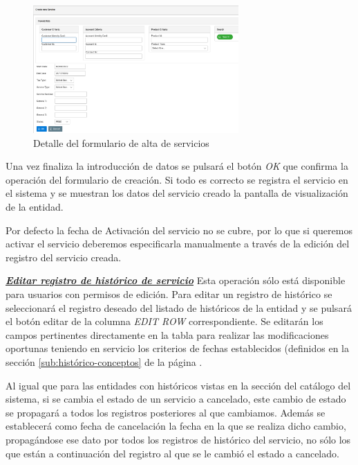 \begin{figure}[H]
  \centering
  \includegraphics[width=0.70\textwidth]{imaxes/formulario-alta-servicio.png}
  \caption{Detalle del formulario de alta de servicios}
  \label{fig:formulario-alta-servicio}
\end{figure}

Una vez finaliza la introducción de datos se pulsará el botón \emph{OK} que confirma la operación del formulario de creación. Si todo es correcto se registra el servicio en el sistema y se muestran los datos del servicio creado la pantalla de visualización de la entidad.

Por defecto la fecha de Activación del servicio no se cubre, por lo que si queremos activar el servicio deberemos especificarla manualmente a través de la edición del registro del servicio creada.


\underline{\textsl{\textbf{Editar registro de histórico de servicio}}}\newline
Esta operación sólo está disponible para usuarios con permisos de edición.
Para editar un registro de histórico se seleccionará el registro deseado del listado de históricos de la entidad y se pulsará el botón editar de la columna \textit{EDIT ROW} correspondiente. Se editarán los campos pertinentes directamente en la tabla para realizar las modificaciones oportunas teniendo en servicio los criterios de fechas establecidos (definidos en la sección \ref{sub:histórico-conceptos} de la página \pageref{sub:histórico-conceptos}.

Al igual que para las entidades con históricos vistas en la sección del catálogo del sistema, si se cambia el estado de un servicio a cancelado, este cambio de estado se propagará a todos los registros posteriores al que cambiamos. Además se establecerá como fecha de cancelación la fecha en la que se realiza dicho cambio, propagándose ese dato por todos los registros de histórico del servicio, no sólo los que están a continuación del registro al que se le cambió el estado a cancelado.

